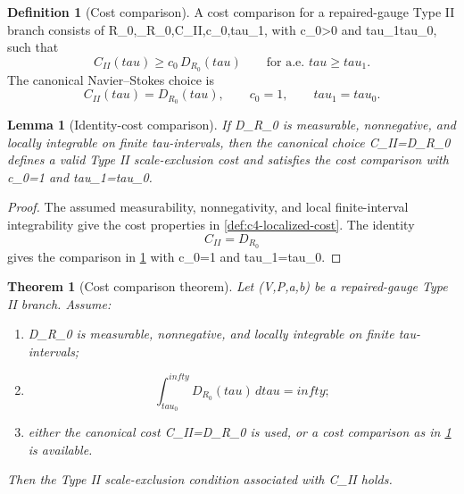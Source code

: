 \documentclass[11pt]{amsart}
\def\({}%
\def\){}%
\def\tilde#1{#1}%
\def\mathfrak#1{#1}%
\def\mathrm#1{#1}%
\def\tau{tau}%
\def\infty{infty}%
\theoremstyle{plain}
\newtheorem{theorem}{Theorem}[section]
\newtheorem{lemma}[lemma]{Lemma}
\theoremstyle{definition}
\newtheorem{definition}[definition]{Definition}
\theoremstyle{remark}
\begin{document}
\begin{definition}[Cost comparison]
\label{def:c4-cost-comparison}
A cost comparison for a repaired-gauge Type II branch consists of
\(R_0,\phi_{R_0},\mathfrak C_{\mathrm{II}},c_0,\tau_1\), with \(c_0>0\) and
\(\tau_1\ge\tau_0\), such that
\[
  \mathfrak C_{\mathrm{II}}(\tau)
  \ge c_0\,\tilde{\mathfrak D}_{R_0}(\tau)
  \qquad\text{for a.e. }\tau\ge\tau_1.
\]
The canonical Navier--Stokes choice is
\[
  \mathfrak C_{\mathrm{II}}(\tau)=\tilde{\mathfrak D}_{R_0}(\tau),
  \qquad c_0=1,\qquad \tau_1=\tau_0.
\]
\end{definition}

\begin{lemma}[Identity-cost comparison]
\label{lem:c4-identity-cost}
If \(\tilde{\mathfrak D}_{R_0}\) is measurable, nonnegative, and locally
integrable on finite \(\tau\)-intervals, then the canonical choice
\(\mathfrak C_{\mathrm{II}}=\tilde{\mathfrak D}_{R_0}\) defines a valid Type II
scale-exclusion cost and satisfies the cost comparison with \(c_0=1\) and
\(\tau_1=\tau_0\).
\end{lemma}

\begin{proof}
The assumed measurability, nonnegativity, and local finite-interval
integrability give the cost properties in \cref{def:c4-localized-cost}.  The
identity
\[
  \mathfrak C_{\mathrm{II}}=\tilde{\mathfrak D}_{R_0}
\]
gives the comparison in \cref{def:c4-cost-comparison} with \(c_0=1\) and
\(\tau_1=\tau_0\).
\end{proof}

\begin{theorem}[Cost comparison theorem]
\label{thm:c4-cost-comparison}
Let \((V,P,a,b)\) be a repaired-gauge Type II branch.  Assume:
\begin{enumerate}[label=\textup{(\roman*)}]
\item \(\tilde{\mathfrak D}_{R_0}\) is measurable, nonnegative, and locally
integrable on finite \(\tau\)-intervals;
\item
\[
  \int_{\tau_0}^{\infty}
  \tilde{\mathfrak D}_{R_0}(\tau)\,d\tau=\infty;
\]
\item either the canonical cost
\(\mathfrak C_{\mathrm{II}}=\tilde{\mathfrak D}_{R_0}\) is used, or a cost
comparison as in \cref{def:c4-cost-comparison} is available.
\end{enumerate}
Then the Type II scale-exclusion condition associated with
\(\mathfrak C_{\mathrm{II}}\) holds.
\end{theorem}
\end{document}
